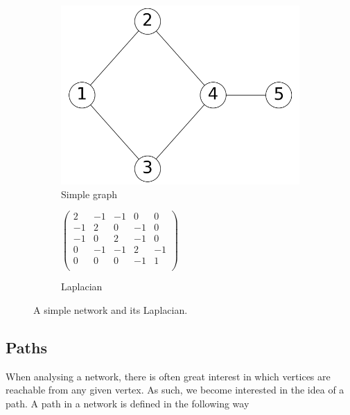 \begin{figure}
    \begin{center}
        \begin{subfigure}[b]{0.45\textwidth}
            \includegraphics[width=\textwidth]{img/simple_example}
            \caption{Simple graph}
            \label{fig:simple_network_2}
        \end{subfigure}
        \begin{subfigure}[b]{0.45\textwidth}
            \begin{center}
            $
            \begin{pmatrix}
                 2 & -1 & -1 &  0 &  0 \\
                -1 &  2 &  0 & -1 &  0 \\
                -1 &  0 &  2 & -1 &  0 \\
                 0 & -1 & -1 &  2 & -1 \\
                 0 &  0 &  0 & -1 &  1 \\
            \end{pmatrix}
            $
            \end{center}
            \caption{Laplacian}
            \label{fig:simple_network_laplacian}
        \end{subfigure}
    \end{center}
    \caption{A simple network and its Laplacian.}
    \label{fig:simple_network_and_laplacian}
\end{figure}


\subsection{Paths}
When analysing a network, there is often great interest in which vertices are reachable from any given vertex. As such, we become interested in the idea of a path. A path in a network is defined in the following way

